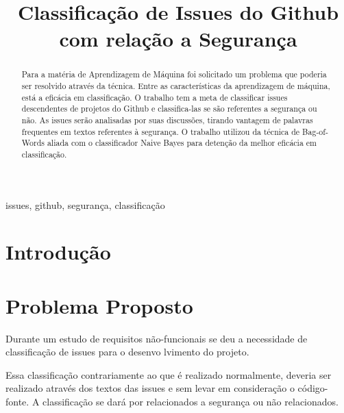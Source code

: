 \documentclass[conference]{IEEEtran}
\begin{document}
\title{Classificação de Issues do Github com relação a Segurança}

\author{
    \and
}

\maketitle

\begin{abstract}
    Para a matéria de Aprendizagem de Máquina foi solicitado um problema que poderia ser resolvido através da técnica. Entre as características da aprendizagem de máquina, está a eficácia em classificação. O trabalho tem a meta de classificar issues descendentes de projetos do Github e classifica-las se são referentes a segurança ou não. As issues serão analisadas por suas discussões, tirando vantagem de palavras frequentes em textos referentes à segurança. O trabalho utilizou da técnica de Bag-of-Words aliada com o classificador Naive Bayes para detenção da melhor eficácia em classificação.
\end{abstract}

\begin{IEEEkeywords}
    issues, github, segurança, classificação
\end{IEEEkeywords}

\section{Introdução}


\section{Problema Proposto}

Durante um estudo de requisitos não-funcionais se deu a necessidade de classificação de issues para o desenvo	lvimento do projeto.

Essa classificação contrariamente ao que é realizado normalmente, deveria ser realizado através dos textos das issues e sem levar em consideração o código-fonte. A classificação se dará por relacionados a segurança ou não relacionados.
\end{document}
